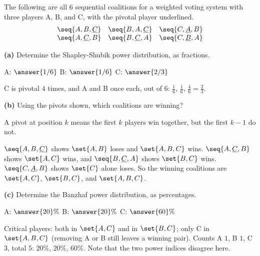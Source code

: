 \documentclass[12pt]{ximera}
\begin{document}
\begin{problem}
The following are all $6$ sequential coalitions for a weighted voting system with three
players A, B, and C, with the pivotal player underlined.
\[
\begin{array}{ccc}
\seq{A,B,\underline{C}} & \seq{B,A,\underline{C}} & \seq{C,\underline{A},B}\\
\seq{A,\underline{C},B} & \seq{B,\underline{C},A} & \seq{C,\underline{B},A}
\end{array}
\]

\begin{prompt}
\textbf{(a)} Determine the Shapley-Shubik power distribution, as fractions.

A: $\answer{1/6}$ \quad B: $\answer{1/6}$ \quad C: $\answer{2/3}$

\begin{feedback}
C is pivotal $4$ times, and A and B once each, out of $6$: $\frac16$, $\frac16$, $\frac46=\frac23$.
\end{feedback}
\end{prompt}

\begin{prompt}
\textbf{(b)} Using the pivots shown, which coalitions are winning?

\begin{selectAll}
\end{selectAll}

\begin{hint}
A pivot at position $k$ means the first $k$ players win together, but the first $k-1$
do not.
\end{hint}

\begin{feedback}
$\seq{A,B,\underline{C}}$ shows $\set{A,B}$ loses and $\set{A,B,C}$ wins.
$\seq{A,\underline{C},B}$ shows $\set{A,C}$ wins, and $\seq{B,\underline{C},A}$ shows
$\set{B,C}$ wins. $\seq{C,\underline{A},B}$ shows $\set{C}$ alone loses. So the winning
coalitions are $\set{A,C}$, $\set{B,C}$, and $\set{A,B,C}$.
\end{feedback}
\end{prompt}

\begin{prompt}
\textbf{(c)} Determine the Banzhaf power distribution, as percentages.

A: $\answer{20}\%$ \quad B: $\answer{20}\%$ \quad C: $\answer{60}\%$

\begin{feedback}
Critical players: both in $\set{A,C}$ and in $\set{B,C}$; only C in $\set{A,B,C}$ (removing
A or B still leaves a winning pair). Counts A $1$, B $1$, C $3$, total $5$: $20\%$,
$20\%$, $60\%$. Note that the two power indices disagree here.
\end{feedback}
\end{prompt}
\end{problem}
\end{document}
